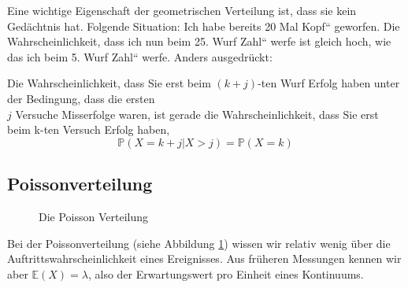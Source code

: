 {\begin{definition}
    \end{definition}

    Eine wichtige Eigenschaft der geometrischen Verteilung ist, dass sie
    kein Gedächtnis hat. Folgende Situation: Ich habe bereits 20 Mal
    {\quotedblbase}Kopf{\textquotedblleft} geworfen. Die
    Wahrscheinlichkeit, dass ich nun beim 25. Wurf
    {\quotedblbase}Zahl{\textquotedblleft} werfe ist gleich hoch, wie das
    ich beim 5. Wurf {\quotedblbase}Zahl{\textquotedblleft} werfe. Anders
    ausgedrückt:

    \begin{satz}Die Wahrscheinlichkeit, dass Sie erst beim
    $\left(k+j\right)$-ten Wurf Erfolg haben unter der Bedingung, dass die ersten \\
    $j$ Versuche Misserfolge waren, ist gerade die Wahrscheinlichkeit, dass
    Sie erst beim k-ten Versuch Erfolg haben, 
    \[
    \mathbb P\left(X=k+j|X>j\right)=\mathbb P\left(X=k\right)
    \]
    \end{satz}
    
    \subsection{Poissonverteilung}\label{sec:poissonverteilung}
    
    {
        \begin{figure}
            \def\nval{20}
            \def\lvala{1}
            \def\lvalb{5}
            \def\lvalc{10}
            \subfigure[Wahrscheinlichkeitsfunktion]{
                \begin{tikzpicture}
                                
                \end{tikzpicture}
                \label{fig:poisson_dist_a}
            }
           \caption{Die Poisson Verteilung}
           \label{fig:poisson_dist}
        \end{figure}
    }

    Bei der Poissonverteilung (siehe Abbildung \ref{fig:poisson_dist}) wissen wir relativ wenig über die
    Auftrittswahrscheinlichkeit eines Ereignisses. Aus früheren Messungen
    kennen wir aber $\mathbb E\left(X\right)=\lambda$, also der Erwartungswert pro Einheit eines Kontinuums.

}
